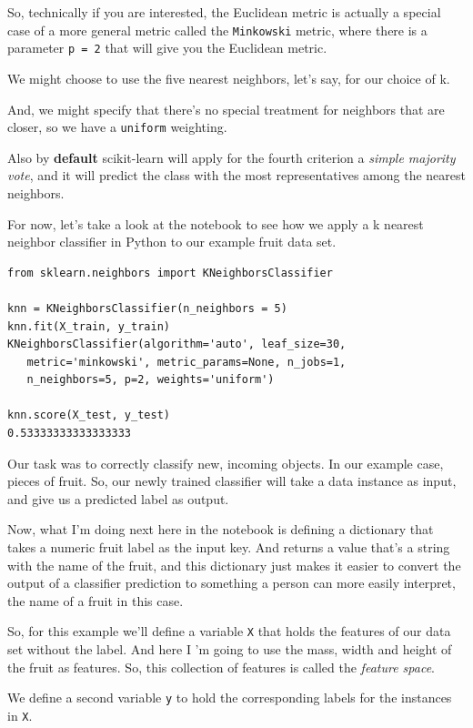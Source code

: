 \begin{multicols}{2}
So, technically if you are interested, the Euclidean metric is actually a special case of a more general metric called the \texttt{Minkowski} metric, where there is a parameter \texttt{p~=~2} that will give you the Euclidean metric. 

We might choose to use the five nearest neighbors, let's say, for our choice of k. 

And, we might specify that there's no special treatment for neighbors that are closer, so we have a \texttt{uniform} weighting. 

Also by \textbf{default} scikit-learn will apply for the fourth criterion a \emph{simple majority vote}, and it will predict the class with the most representatives among the nearest neighbors. 


For now, let's take a look at the notebook to see how we apply a k nearest neighbor classifier in Python to our example fruit data set. 

{\scriptsize
\begin{verbatim}
from sklearn.neighbors import KNeighborsClassifier

knn = KNeighborsClassifier(n_neighbors = 5)
knn.fit(X_train, y_train)
KNeighborsClassifier(algorithm='auto', leaf_size=30, 
   metric='minkowski', metric_params=None, n_jobs=1, 
   n_neighbors=5, p=2, weights='uniform')

knn.score(X_test, y_test)
0.53333333333333333           
\end{verbatim}
}

Our task was to correctly classify new, incoming objects. In our example case, pieces of fruit. So, our newly trained classifier will take a data instance as input, and give us a predicted label as output. 

Now, what I'm doing next here in the notebook is defining a dictionary that takes a numeric fruit label as the input key. And returns a value that's a string with the name of the fruit, and this dictionary just makes it easier to convert the output of a classifier prediction to something a person can more easily interpret, the name of a fruit in this case. 

So, for this example we'll define a variable \texttt{X} that holds the features of our data set without the label. And here I 'm going to use the mass, width and height of the fruit as features. So, this collection of features is called the \emph{feature space}. 

We define a second variable \texttt{y} to hold the corresponding labels for the instances in \texttt{X}. 


\end{multicols}
